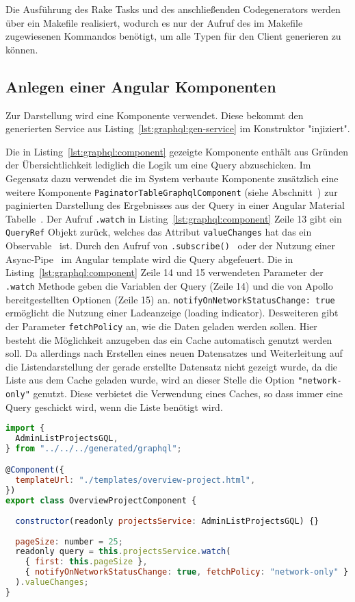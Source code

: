 Die Ausführung des Rake Tasks und des anschließenden Codegenerators werden über ein Makefile realisiert, wodurch es nur der Aufruf des im Makefile zugewiesenen Kommandos benötigt, um alle Typen für den Client generieren zu können. 

\subsection{Anlegen einer Angular Komponenten}
\label{impl:graphql:component}

Zur Darstellung wird eine Komponente verwendet. Diese bekommt den generierten Service aus Listing~\ref{lst:graphql:gen-service} im Konstruktor "injiziert". 

Die in Listing~\ref{lst:graphql:component} gezeigte Komponente enthält aus Gründen der Übersichtlichkeit lediglich die Logik um eine Query abzuschicken. Im Gegensatz dazu verwendet die im System verbaute Komponente zusätzlich eine weitere Komponente \lstinline|PaginatorTableGraphqlComponent| (siehe Abschnitt~) zur paginierten Darstellung des Ergebnisses aus der Query in einer Angular Material Tabelle~\cite{angular-material-table}.
Der Aufruf \lstinline|.watch| in Listing~\ref{lst:graphql:component} Zeile 13 gibt ein \lstinline|QueryRef| Objekt zurück, welches das Attribut \lstinline|valueChanges| hat das ein Observable~\cite{angular-observable} ist.
Durch den Aufruf von \lstinline|.subscribe()|~\cite{angular-subscribe} oder der Nutzung einer Async-Pipe~\cite{angular-async-pipe} im Angular template wird die Query abgefeuert.
Die in Listing~\ref{lst:graphql:component} Zeile 14 und 15 verwendeten Parameter der \lstinline|.watch| Methode geben die Variablen der Query (Zeile 14) und die von Apollo bereitgestellten Optionen (Zeile 15) an.
\lstinline|notifyOnNetworkStatusChange: true| ermöglicht die Nutzung einer Ladeanzeige (loading indicator). Desweiteren gibt der Parameter \lstinline|fetchPolicy| an, wie die Daten geladen werden sollen. Hier besteht die Möglichkeit anzugeben das ein Cache automatisch genutzt werden soll. Da allerdings nach Erstellen eines neuen Datensatzes und Weiterleitung auf die Listendarstellung der gerade erstellte Datensatz nicht gezeigt wurde, da die Liste aus dem Cache geladen wurde, wird an dieser Stelle die Option \lstinline|"network-only"| genutzt. Diese verbietet die Verwendung eines Caches, so dass immer eine Query geschickt wird, wenn die Liste benötigt wird.

\begin{lstlisting}[language=JavaScript,float=h!,caption={Angular Komponente zum Anzeigen der Projekte in Listendarstellung}, label={lst:graphql:component}]
import {
  AdminListProjectsGQL,
} from "../../../generated/graphql";

@Component({
  templateUrl: "./templates/overview-project.html",
})
export class OverviewProjectComponent {  
  
  constructor(readonly projectsService: AdminListProjectsGQL) {}
  
  pageSize: number = 25;
  readonly query = this.projectsService.watch(
    { first: this.pageSize },
    { notifyOnNetworkStatusChange: true, fetchPolicy: "network-only" }
  ).valueChanges;
}
\end{lstlisting}

